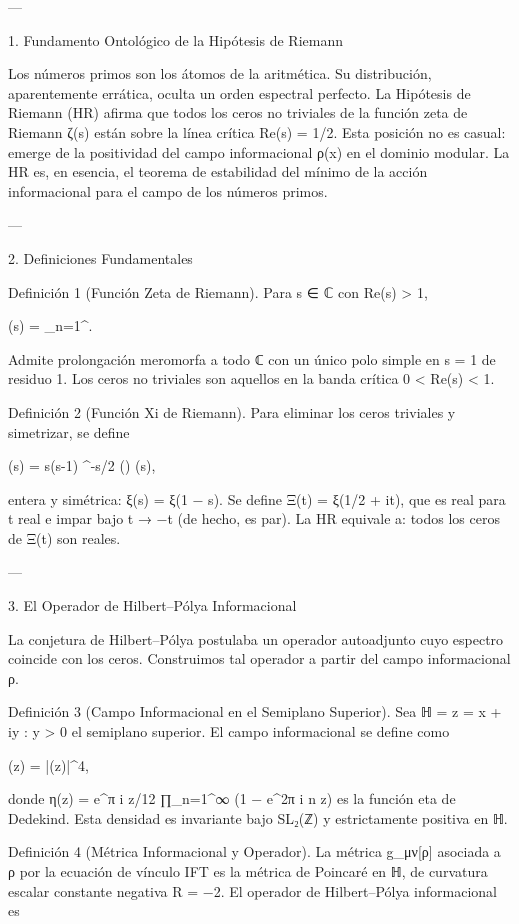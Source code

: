 \documentclass[12pt,twoside]{book}
\begin{document}
---

1. Fundamento Ontológico de la Hipótesis de Riemann

Los números primos son los átomos de la aritmética. Su distribución, aparentemente errática, oculta un orden espectral perfecto. La Hipótesis de Riemann (HR) afirma que todos los ceros no triviales de la función zeta de Riemann ζ(s) están sobre la línea crítica Re(s) = 1/2. Esta posición no es casual: emerge de la positividad del campo informacional ρ(x) en el dominio modular. La HR es, en esencia, el teorema de estabilidad del mínimo de la acción informacional para el campo de los números primos.

---

2. Definiciones Fundamentales

Definición 1 (Función Zeta de Riemann). Para s ∈ ℂ con Re(s) > 1,

\zeta(s) = \sum_{n=1}^\infty {}.

Admite prolongación meromorfa a todo ℂ con un único polo simple en s = 1 de residuo 1. Los ceros no triviales son aquellos en la banda crítica 0 < Re(s) < 1.

Definición 2 (Función Xi de Riemann). Para eliminar los ceros triviales y simetrizar, se define

\xi(s) =  s(s-1) \pi^{-s/2} \Gamma\!\left(\right) \zeta(s),

entera y simétrica: ξ(s) = ξ(1 − s). Se define Ξ(t) = ξ(1/2 + it), que es real para t real e impar bajo t → −t (de hecho, es par). La HR equivale a: todos los ceros de Ξ(t) son reales.

---

3. El Operador de Hilbert–Pólya Informacional

La conjetura de Hilbert–Pólya postulaba un operador autoadjunto cuyo espectro coincide con los ceros. Construimos tal operador a partir del campo informacional ρ.

Definición 3 (Campo Informacional en el Semiplano Superior). Sea ℍ = {z = x + iy : y > 0} el semiplano superior. El campo informacional se define como

\rho(z) = |\eta(z)|^4,

donde η(z) = e^{π i z/12} ∏_{n=1}^∞ (1 − e^{2π i n z}) es la función eta de Dedekind. Esta densidad es invariante bajo SL₂(ℤ) y estrictamente positiva en ℍ.

Definición 4 (Métrica Informacional y Operador). La métrica g_{μν}[ρ] asociada a ρ por la ecuación de vínculo IFT es la métrica de Poincaré en ℍ, de curvatura escalar constante negativa R = −2. El operador de Hilbert–Pólya informacional es
\end{document}
